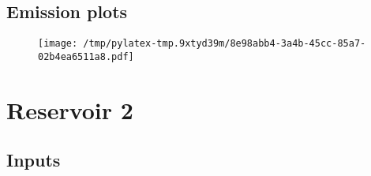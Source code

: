 \documentclass{article}%
\begin{document}
\subsection{Emission plots}%
\label{subsec:Emissionplots}%


\begin{figure}[htbp]%
\centering%
\texttt{[image: /tmp/pylatex-tmp.9xtyd39m/8e98abb4-3a4b-45cc-85a7-02b4ea6511a8.pdf]}%
\end{figure}

%
\section{Reservoir 2}%
\label{sec:Reservoir2}%
\subsection{Inputs}%
\label{subsec:Inputs}%
\end{document}
